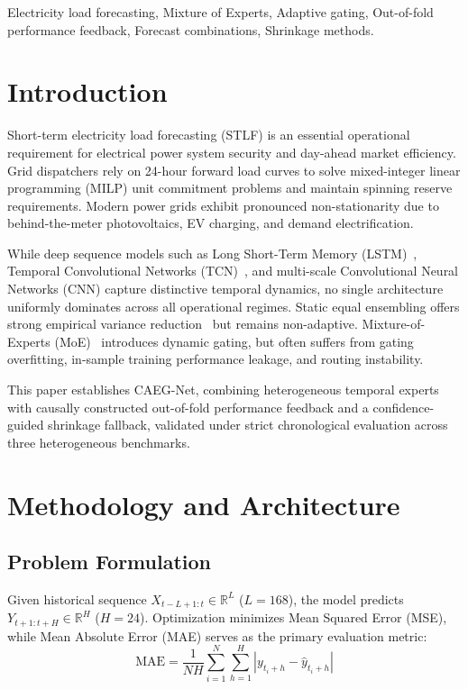 \documentclass[journal,10pt,twocolumn]{IEEEtran}
\begin{document}
\begin{IEEEkeywords}
Electricity load forecasting, Mixture of Experts, Adaptive gating, Out-of-fold performance feedback, Forecast combinations, Shrinkage methods.
\end{IEEEkeywords}

\section{Introduction}
Short-term electricity load forecasting (STLF) is an essential operational requirement for electrical power system security and day-ahead market efficiency. Grid dispatchers rely on 24-hour forward load curves to solve mixed-integer linear programming (MILP) unit commitment problems and maintain spinning reserve requirements. Modern power grids exhibit pronounced non-stationarity due to behind-the-meter photovoltaics, EV charging, and demand electrification.

While deep sequence models such as Long Short-Term Memory (LSTM)~\cite{hochreiter1997long}, Temporal Convolutional Networks (TCN)~\cite{bai2018empirical}, and multi-scale Convolutional Neural Networks (CNN) capture distinctive temporal dynamics, no single architecture uniformly dominates across all operational regimes. Static equal ensembling offers strong empirical variance reduction~\cite{clemen1989combining,timmermann2006forecast} but remains non-adaptive. Mixture-of-Experts (MoE)~\cite{jacobs1991adaptive} introduces dynamic gating, but often suffers from gating overfitting, in-sample training performance leakage, and routing instability.

This paper establishes CAEG-Net, combining heterogeneous temporal experts with causally constructed out-of-fold performance feedback and a confidence-guided shrinkage fallback, validated under strict chronological evaluation across three heterogeneous benchmarks.

\section{Methodology and Architecture}
\subsection{Problem Formulation}
Given historical sequence $X_{t-L+1:t} \in \mathbb{R}^L$ ($L=168$), the model predicts $Y_{t+1:t+H} \in \mathbb{R}^H$ ($H=24$). Optimization minimizes Mean Squared Error (MSE), while Mean Absolute Error (MAE) serves as the primary evaluation metric:
\begin{equation}
\text{MAE} = \frac{1}{NH} \sum_{i=1}^N \sum_{h=1}^H |y_{t_i+h} - \hat{y}_{t_i+h}|
\end{equation}
\end{document}
